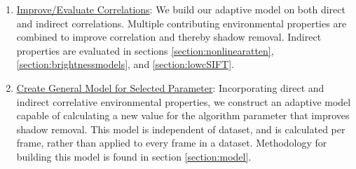 \documentclass[12pt]{report}
\begin{document}
\begin{enumerate}
\item \underline{Improve/Evaluate Correlations}: We build our adaptive model on both direct and indirect correlations. Multiple contributing environmental properties are combined to improve correlation and thereby shadow removal. Indirect properties are evaluated in sections \ref{section:nonlinearatten}, \ref{section:brightnessmodels}, and \ref{section:lowcSIFT}.

\item \underline{Create General Model for Selected Parameter}: Incorporating direct and indirect correlative environmental properties, we construct an adaptive model capable of calculating a new value for the algorithm parameter that improves shadow removal. This model is independent of dataset, and is calculated per frame, rather than applied to every frame in a dataset. Methodology for building this model is found in section \ref{section:model}.
\end{enumerate}
\end{document}
